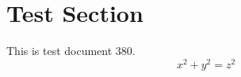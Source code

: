 \documentclass{article}
\begin{document}
\section{Test Section}
This is test document 380.
\begin{equation}
x^2 + y^2 = z^2
\end{equation}
\end{document}

